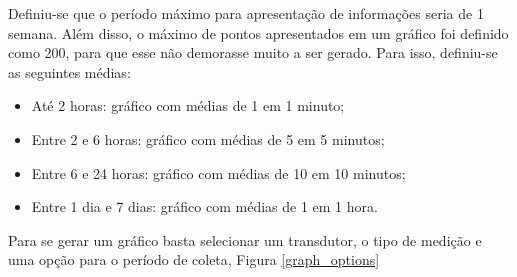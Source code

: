 Definiu-se que o período máximo para apresentação de informações seria de 1 semana. Além disso, o máximo de pontos apresentados em um gráfico foi definido como 200, para que esse não demorasse muito a ser gerado. Para isso, definiu-se as seguintes médias:

\begin{itemize}
    \item Até 2 horas: gráfico com médias de 1 em 1 minuto;
    \item Entre 2 e 6 horas: gráfico com médias de 5 em 5 minutos;
    \item Entre 6 e 24 horas: gráfico com médias de 10 em 10 minutos;
    \item Entre 1 dia e 7 dias: gráfico com médias de 1 em 1 hora.
\end{itemize}

Para se gerar um gráfico basta selecionar um transdutor, o tipo de medição e uma opção para o período de coleta, Figura \ref{graph_options}

